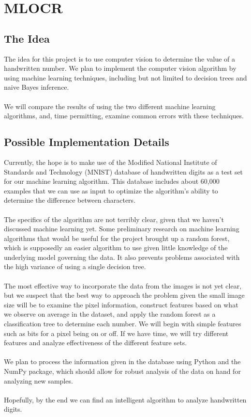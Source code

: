\documentclass{article}
\theoremstyle{definition}
\theoremstyle{remark}
\begin{document}
	 \section*{MLOCR}
	\label*{Optical Character Recognition using Machine Learning}
	   \subsection*{The Idea}
     The idea for this project is to use computer vision to determine the value of a handwritten number. We plan to implement the computer vision algorithm by using machine learning techniques, including but not limited to decision trees and naive Bayes inference. \\\\
     We will compare the results of using the two different machine learning algorithms, and, time permitting, examine common errors with these techniques.
     \subsection*{Possible Implementation Details}
     Currently, the hope is to make use of the Modified National Institute of Standards and Technology (MNIST) database of handwritten digits as a test set for our machine learning algorithm. This database includes about 60,000 examples that we can use as input to optimize the algorithm's ability to determine the difference between characters. \\\\
     The specifics of the algorithm are not terribly clear, given that we haven't discussed machine learning yet. Some preliminary research on machine learning algorithms that would be useful for the project brought up a random forest, which is supposedly an easier algorithm to use given little knowledge of the underlying model governing the data. It also prevents problems associated with the high variance of using a single decision tree. \\\\
     The most effective way to incorporate the data from the images is not yet clear, but we suspect that the best way to approach the problem given the small image size will be to examine the pixel information, construct features based on what we observe on average in the dataset, and apply the random forest as a classification tree to determine each number. We will begin with simple features such as bits for a pixel being on or off. If we have time, we will try different features and analyze effectiveness of the different feature sets.\\\\
     We plan to process the information given in the database using Python and the NumPy package, which should allow for robust analysis of the data on hand for analyzing new samples. \\\\
     Hopefully, by the end we can find an intelligent algorithm to analyze handwritten digits.
    
\end{document}
